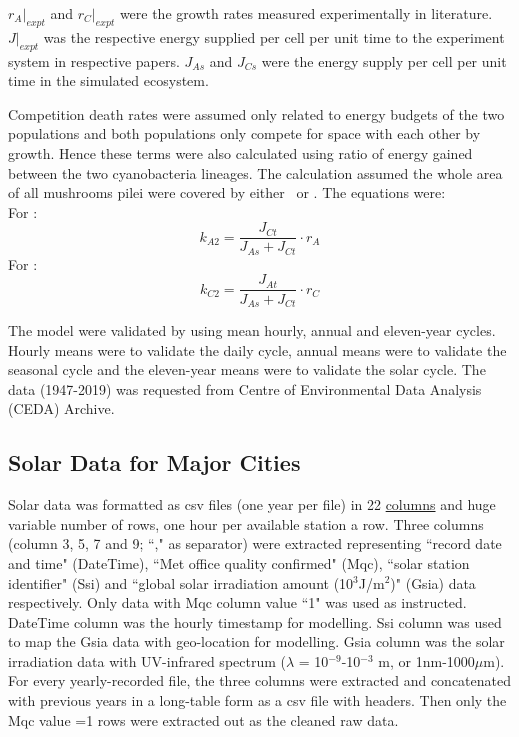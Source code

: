 \documentclass[../thesis.tex]{subfiles} %
\begin{document}
$r_A|_{expt}$ and $r_C|_{expt}$ were the growth rates measured experimentally in literature.  $J|_{expt}$ was the respective energy supplied per cell per unit time to the experiment system in respective papers.  $J_{As}$ and $J_{Cs}$ were the energy supply per cell per unit time in the simulated ecosystem.

Competition death rates were assumed only related to energy budgets of the two populations and both populations only compete for space with each other by growth.  Hence these terms were also calculated using ratio of energy gained between the two cyanobacteria lineages.  The calculation assumed the whole area of all mushrooms pilei were covered by either \As\ or \Cs.  The equations were:\\
For \As:
\begin{equation}
    k_{A2} = \dfrac{J_{Ct}}{J_{As} + J_{Ct}}\cdot r_A
\end{equation}
For \Cs:
\begin{equation}
    k_{C2} = \dfrac{J_{At}}{J_{As} + J_{Ct}}\cdot r_C
\end{equation}

The model were validated by using mean hourly, annual and eleven-year cycles.  Hourly means were to validate the daily cycle, annual means were to validate the seasonal cycle and the eleven-year means were to validate the solar cycle.  The data (1947-2019) was requested from Centre of Environmental Data Analysis (CEDA) Archive.\autocite{solarData}

\subsection{Solar Data for Major Cities} %
Solar data was formatted as csv files (one year per file) in 22 \href{https://artefacts.ceda.ac.uk/badc_datadocs/ukmo-midas/RO_Table.html#definition}{columns} and huge variable number of rows, one hour per available station a row.  Three columns (column 3, 5, 7 and 9; ``," as separator) were extracted representing ``record date and time" (DateTime), ``Met office quality confirmed" (Mqc), ``solar station identifier" (Ssi) and ``global solar irradiation amount (10$^{3}$J/m$^{2}$)" (Gsia) data respectively.  Only data with Mqc column value ``1" was used as instructed.  DateTime column was the hourly timestamp for modelling. Ssi column was used to map the Gsia data with geo-location for modelling.  Gsia column was the solar irradiation data with UV-infrared spectrum ($\lambda$ = 10$^{-9}$-10$^{-3}$ m, or 1nm-1000$\mu$m).  For every yearly-recorded file, the three columns were extracted and concatenated with previous years in a long-table form as a csv file with headers.  Then only the Mqc value =1 rows were extracted out as the cleaned raw data.
\end{document}
